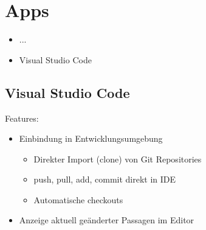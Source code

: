 \section{Apps}
\begin{frame}
\begin{itemize}
	\item ...
	\item Visual Studio Code
\end{itemize}
\end{frame}

\subsection{Visual Studio Code}
\begin{frame}
Features:
\begin{itemize}
	\item <2->Einbindung in Entwicklungsumgebung
	\begin{itemize}
		\item <3->Direkter Import (clone) von Git Repositories
		\item <4->push, pull, add, commit direkt in IDE
		\item <5->Automatische checkouts
	\end{itemize}
	\item <6->Anzeige aktuell geänderter Passagen im Editor
\end{itemize}
\end{frame}